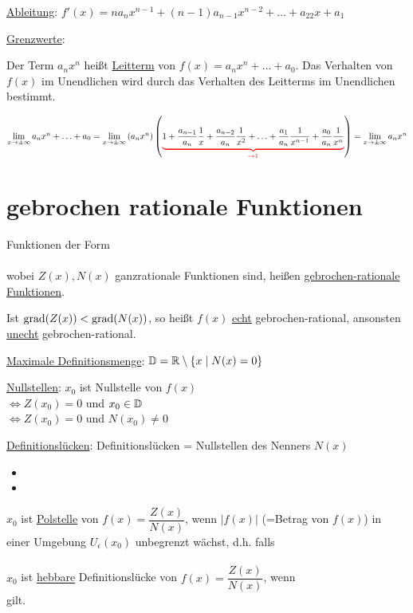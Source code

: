 \ul{Ableitung}: $f'(x)=na_nx^{n-1}+(n-1)a_{n-1}x^{n-2}+\ldots+a_22x+a_1$

\ul{Grenzwerte}:

Der Term $a_nx^n$ heißt \ul{Leitterm} von $f(x)=a_nx^n+\ldots+a_0$. Das Verhalten von $f(x)$ im Unendlichen wird durch das Verhalten des Leitterms im Unendlichen bestimmt.

\Beweis $\lim\limits_{x\to\pm\infty} a_nx^n+\ldots+a_0=\lim\limits_{x\to\pm\infty}\left(a_nx^n\right)\left(\textcolor{red}{\underbrace{\textcolor{black}{1+\dfrac{a_{n-1}}{a_n}\dfrac{1}{x}+\dfrac{a_{n-2}}{a_n}\dfrac{1}{x^2}+\ldots+\dfrac{a_1}{a_n}\dfrac{1}{x^{n-1}}+\dfrac{a_0}{a_n}\dfrac{1}{x^n}}}_{\to1}}\right)=\lim\limits_{x\to\pm\infty} a_nx^n$

\clearpage
\section{gebrochen rationale Funktionen}
\Def Funktionen der Form\\
\\
wobei $Z(x),N(x)$ ganzrationale Funktionen sind, heißen \ul{gebrochen-rationale Funktionen}.

Ist $\mathbin\text{grad}(Z(x))<\mathbin\text{grad}(N(x))$, so heißt $f(x)$ \ul{echt} gebrochen-rational, ansonsten \ul{unecht} gebrochen-rational.

\ul{Maximale Definitionsmenge}: $\mathbb{D}=\mathbb{R}\setminus\{x\mid N(x) = 0\}$

\ul{Nullstellen}: $x_0$ ist Nullstelle von $f(x)$\\
$\Leftrightarrow Z(x_0)=0$ und $x_0\in\mathbb{D}$\\
$\Leftrightarrow Z(x_0)=0$ und $N(x_0)\ne0$

\ul{Definitionslücken}: Definitionslücken = Nullstellen des Nenners $N(x)$
\begin{itemize}
	\item {}
	\item {}
\end{itemize}

$x_0$ ist \ul{Polstelle} von $f(x)=\dfrac{Z(x)}{N(x)}$, wenn $|f(x)|$ (=Betrag von $f(x)$) in einer Umgebung $U_\epsilon(x_0)$ unbegrenzt wächst, d.h. falls\\
\\
$x_0$ ist \ul{hebbare} Definitionslücke von $f(x)=\dfrac{Z(x)}{N(x)}$, wenn\\
 gilt.

